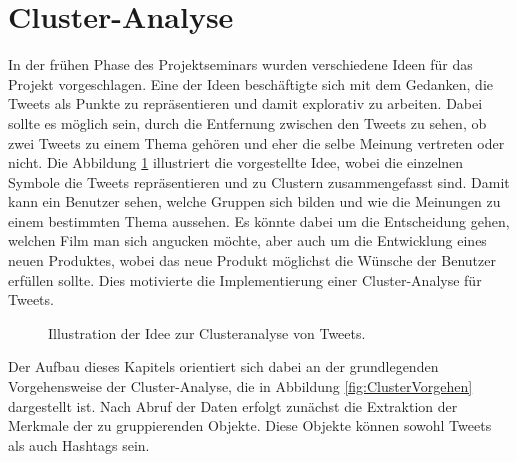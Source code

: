 \section{Cluster-Analyse}
In der frühen Phase des Projektseminars wurden verschiedene Ideen für das 
Projekt vorgeschlagen. Eine der Ideen beschäftigte sich mit dem Gedanken, 
die Tweets als Punkte zu repräsentieren und damit explorativ zu arbeiten.
Dabei sollte es möglich sein, durch die Entfernung zwi\-schen den Tweets zu
sehen, ob zwei Tweets zu einem Thema gehören und eher die selbe Meinung vertreten oder nicht. Die Abbildung 
\ref{fig:ClusteringIdee} illustriert die vorgestellte Idee, wobei die einzelnen Symbole 
die Tweets repräsentieren und zu Clustern zusammengefasst sind. Damit kann ein Benutzer sehen, welche Gruppen sich bilden und wie die Meinungen zu einem bestimmten Thema aussehen. Es könnte dabei um die Entscheidung gehen,
welchen Film man sich angucken möchte, aber auch um die Entwicklung eines 
neuen Produktes, wobei das neue Produkt möglichst die Wünsche der Benutzer erfüllen sollte.
Dies motivierte die Implementierung einer Cluster-Analyse für Tweets.

\begin{figure}[h]
 \centering
 
\caption{Illustration der Idee zur Clusteranalyse von Tweets.}
\label{fig:ClusteringIdee}
\end{figure} 

Der Aufbau dieses Kapitels orientiert sich dabei an der grundlegenden 
Vorgehensweise der Cluster-Analyse, die in Abbildung \ref{fig:ClusterVorgehen} 
dargestellt ist. Nach Abruf der Daten erfolgt zunächst die Extraktion der 
Merkmale der zu gruppierenden Objekte. Diese Objekte können sowohl Tweets als auch Hashtags sein. 

